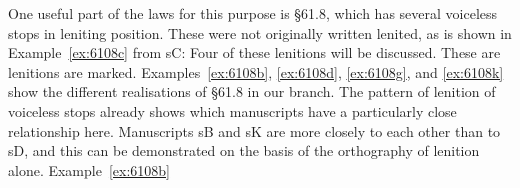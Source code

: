 One useful part of the laws for this purpose is \S 61.8, which has several voiceless stops in leniting position. These were not originally written lenited, as is shown in Example~\ref{ex:6108c} from \gls{sC}:
Four of these lenitions will be discussed. These are lenitions are marked. Examples~\ref{ex:6108b}, \ref{ex:6108d}, \ref{ex:6108g}, and \ref{ex:6108k} show the different realisations of \S 61.8 in our branch. The pattern of lenition of voiceless stops already shows which manuscripts have a particularly close relationship here. Manuscripts \gls{sB} and \gls{sK} are more closely to each other than to \gls{sD}, and this can be demonstrated on the basis of the orthography of lenition alone. Example~\ref{ex:6108b} 
